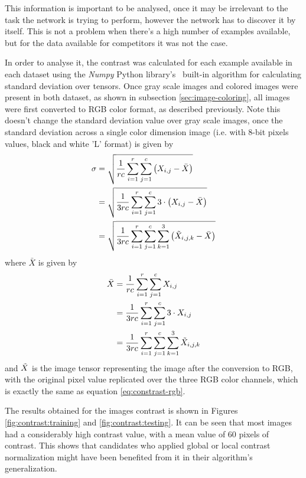 \documentclass[12pt,
    brazil,			%
	english,        %
	]{article}
\begin{document}
This information is important to be analysed, once it may be irrelevant to the task the network is trying to perform, however the network has to discover it by itself. This is not a problem when there's a high number of examples available, but for the data available for competitors it was not the case.

In order to analyse it, the contrast was calculated for each example available in each dataset using the \textit{Numpy} Python library's~\cite{numpy2019docs} built-in algorithm for calculating standard deviation over tensors. Once gray scale images and colored images were present in both dataset, as shown in subsection \ref{sec:image-coloring}, all images were first converted to RGB color format, as described previously. Note this doesn't change the standard deviation value over gray scale images, once the standard deviation across a single color dimension image (i.e. with 8-bit pixels values, black and white 'L' format) is given by
\begin{alignat}{2}
    \sigma  &= \sqrt{\frac{1}{rc} \sum_{i=1}^{r} \sum_{j=1}^{c} \left(X_{i,j} - \bar{X}\right)} \\
            &= \sqrt{\frac{1}{3rc} \sum_{i=1}^{r} \sum_{j=1}^{c} 3 \cdot \left(X_{i,j} - \bar{X}\right)} \\
            &= \sqrt{\frac{1}{3rc}\sum_{i=1}^{r} \sum_{j=1}^{c} \sum_{k=1}^{3} \left(\Tilde{X}_{i,j,k} - \bar{X}\right)}
\end{alignat}
where $\bar{X}$ is given by
\begin{alignat}{2}
    \bar{X} &= \frac{1}{rc} \sum_{i=1}^{r} \sum_{j=1}^{c} X_{i,j} \\
            &= \frac{1}{3rc} \sum_{i=1}^{r} \sum_{j=1}^{c} 3 \cdot X_{i,j} \\
            &= \frac{1}{3rc} \sum_{i=1}^{r} \sum_{j=1}^{c} \sum_{k=1}^{3} \Tilde{X}_{i,j,k}
\end{alignat}
and $\Tilde{X}$ is the image tensor representing the image after the conversion to RGB, with the original pixel value replicated over the three RGB color channels, which is exactly the same as equation \ref{eq:constrast-rgb}.

The results obtained for the images contrast is shown in Figures \ref{fig:contrast:training} and \ref{fig:contrast:testing}. It can be seen that most images had a considerably high contrast value, with a mean value of 60 pixels of contrast. This shows that candidates who applied global or local contrast normalization might have been benefited from it in their algorithm's generalization.
\end{document}
